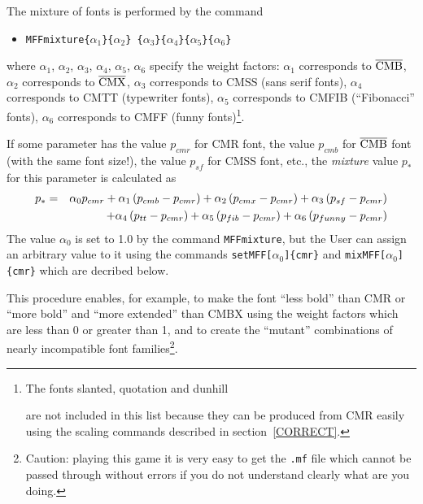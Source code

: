 The mixture of fonts is performed by the command
\begin{itemize}
\item[] {\tt \bs{}MFFmixture\{$\alpha_1$\}\{$\alpha_2$\}%
            \{$\alpha_3$\}\{$\alpha_4$\}\{$\alpha_5$\}\{$\alpha_6$\}}
\end{itemize}
where $\alpha_1$, $\alpha_2$, $\alpha_3$, $\alpha_4$,
$\alpha_5$,  $\alpha_6$ specify
the weight factors:
$\alpha_1$ corresponds to $\overline{\hbox{CMB}}$,
$\alpha_2$ corresponds to $\overline{\hbox{CMX}}$,
$\alpha_3$ corresponds to CMSS (sans serif fonts),
$\alpha_4$ corresponds to CMTT (typewriter fonts),
$\alpha_5$ corresponds to CMFIB (``Fibonacci'' fonts),
$\alpha_6$ corresponds to CMFF (funny fonts)\footnote{%
The fonts {\csl slanted}, {\cmq quotation} and {\cmd dunhill}

are not included in this list because they can be produced
from CMR easily using the scaling commands described
in section~\ref{CORRECT}.}.

If some parameter has the value $p_{cmr}$ for CMR font,
the value $p_{cmb}$ for $\overline{\hbox{CMB}}$ font
(with the same font size!), the value $p_{sf}$ for CMSS font, etc.,
the {\em mixture} value $p_*$ for this parameter is calculated as
\begin{eqnarray}
p_* &=& \alpha_0 p_{cmr}
    + \alpha_1 \left(p_{cmb}-p_{cmr}\right)
    + \alpha_2 \left(p_{cmx}-p_{cmr}\right)
    + \alpha_3 \left(p_{sf}-p_{cmr}\right)
\cr &&\quad\quad
    + \alpha_4 \left(p_{tt}-p_{cmr}\right)
    + \alpha_5 \left(p_{fib}-p_{cmr}\right)
    + \alpha_6 \left(p_{funny}-p_{cmr}\right)
\label{Eq1}
\end{eqnarray}
The value $\alpha_0$ is set to 1.0 by the command {\tt \bs{}MFFmixture},
but the User can assign an arbitrary value to it using the
commands {\tt\bs{}setMFF[$\alpha_0$]\{cmr\}} and
{\tt\bs{}mixMFF[$\alpha_0$]\{cmr\}} which are decribed below.

This procedure enables, for example, to make the font ``less bold''
than CMR or ``more bold'' and ``more extended'' than CMBX
using the weight factors which are less than 0 or greater than 1,
and to create the ``mutant'' combinations of nearly incompatible
font families\footnote{Caution: playing this game
it is very easy to get the {\tt .mf} file which cannot
be passed through \MF{} without errors if you do not
understand clearly what are you doing.}.

